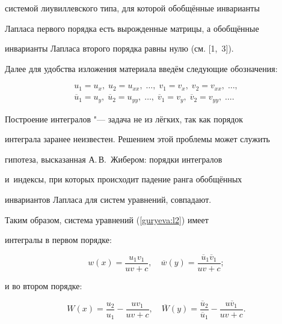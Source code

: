 системой лиувиллевского типа, для которой обобщённые инварианты


Лапласа первого порядка есть вырожденные матрицы, а обобщённые


инварианты Лапласа второго порядка равны нулю (см. [1,~3]).





Далее для удобства изложения материала введём следующие обозначения:


\begin{align*}


 u_{1}=u_{x}, \; u_{2}=u_{xx},  \; \ldots ,  \;  v_{1}=v_{x}, \; v_{2}=v_{xx},  \; \ldots ,  \\


\overline{u}_{1}=u_{y}, \; \overline{u}_{2}=u_{yy},  \; \ldots , \; \overline{v}_{1}=v_{y}, \; \overline {v}_{2}=v_{yy},  \;


\ldots .


\end{align*}








Построение интегралов "--- задача не из лёгких, так как порядок


интеграла заранее неизвестен. Решением этой проблемы может служить


гипотеза, высказанная А.\,В.~Жибером: порядки интегралов


и~индексы, при которых происходит  падение ранга обобщённых


инвариантов Лапласа для систем уравнений, совпадают.





Таким образом,  система уравнений (\ref{guryeva:l2}) имеет


интегралы в первом порядке:


\begin{equation}


\label{guryeva:j1}


w(x)=\frac{u_{1}v_{1}}{uv+c}, \quad


\overline{w}(y)=\frac{\overline{u}_{1}\overline{v}_{1}}{uv+c};


\end{equation}


и во втором порядке:


\begin{equation}


\label{guryeva:j2}


W(x)=\frac{u_{2}}{u_{1}}-\frac{uv_{1}}{uv+c},\quad


\overline{W}(y)=\frac{\overline{u}_{2}}{\overline{u}_{1}}-\frac{u


\overline{v}_{1}}{uv+c}.


\end{equation}











